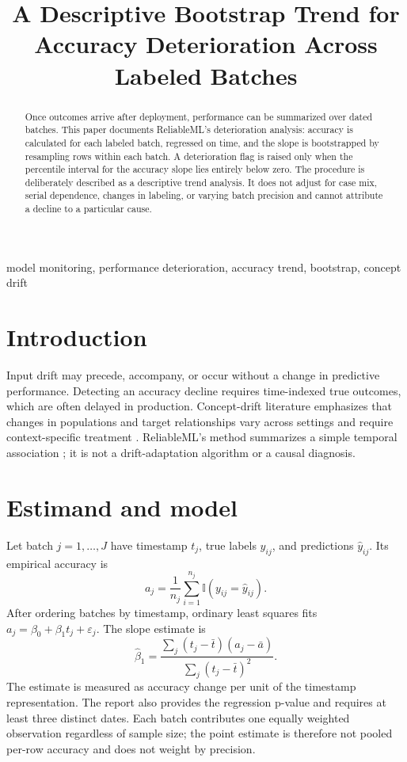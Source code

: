 \documentclass[conference]{IEEEtran}
\title{A Descriptive Bootstrap Trend for Accuracy Deterioration Across Labeled Batches}
\author{
\jabulaniauthor
\and
\martinchanzauthor
\and
\oloratoauthor
\and
\mfundoauthor
}
\begin{document}
\maketitle

\begin{abstract}
Once outcomes arrive after deployment, performance can be summarized over dated batches. This paper documents ReliableML's deterioration analysis: accuracy is calculated for each labeled batch, regressed on time, and the slope is bootstrapped by resampling rows within each batch. A deterioration flag is raised only when the percentile interval for the accuracy slope lies entirely below zero. The procedure is deliberately described as a descriptive trend analysis. It does not adjust for case mix, serial dependence, changes in labeling, or varying batch precision and cannot attribute a decline to a particular cause.
\end{abstract}

\begin{IEEEkeywords}
model monitoring, performance deterioration, accuracy trend, bootstrap, concept drift
\end{IEEEkeywords}

\section{Introduction}
Input drift may precede, accompany, or occur without a change in predictive performance. Detecting an accuracy decline requires time-indexed true outcomes, which are often delayed in production. Concept-drift literature emphasizes that changes in populations and target relationships vary across settings and require context-specific treatment \cite{gama2014}. ReliableML's method summarizes a simple temporal association \cite{software}; it is not a drift-adaptation algorithm or a causal diagnosis.

\section{Estimand and model}
Let batch \(j=1,\ldots,J\) have timestamp \(t_j\), true labels \(y_{ij}\), and predictions \(\hat y_{ij}\). Its empirical accuracy is
\[
a_j=\frac{1}{n_j}\sum_{i=1}^{n_j}\mathbb{I}(y_{ij}=\hat y_{ij}).
\]
After ordering batches by timestamp, ordinary least squares fits \(a_j=\beta_0+\beta_1 t_j+\varepsilon_j\). The slope estimate is
\[
\hat\beta_1=
\frac{\sum_j(t_j-\bar t)(a_j-\bar a)}
{\sum_j(t_j-\bar t)^2}.
\]
The estimate is measured as accuracy change per unit of the timestamp representation. The report also provides the regression p-value and requires at least three distinct dates. Each batch contributes one equally weighted observation regardless of sample size; the point estimate is therefore not pooled per-row accuracy and does not weight by precision.
\end{document}
